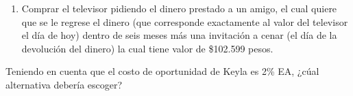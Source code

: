 \documentclass[../main.tex]{subfiles}
\begin{document}
\begin{enumerate}[(a)]
\begin{enumerate}[(1)]
\item Comprar el televisor pidiendo el dinero prestado a un amigo, el cual quiere que se le regrese el dinero (que corresponde exactamente al valor del televisor el día de hoy) dentro de seis meses más una invitación a cenar (el día de la devolución del dinero) la cual tiene valor de \$102.599 pesos.

\end{enumerate}

Teniendo en cuenta que el costo de oportunidad de Keyla es 2\% EA, ¿cúal alternativa debería escoger?

\end{enumerate}
\end{document}
